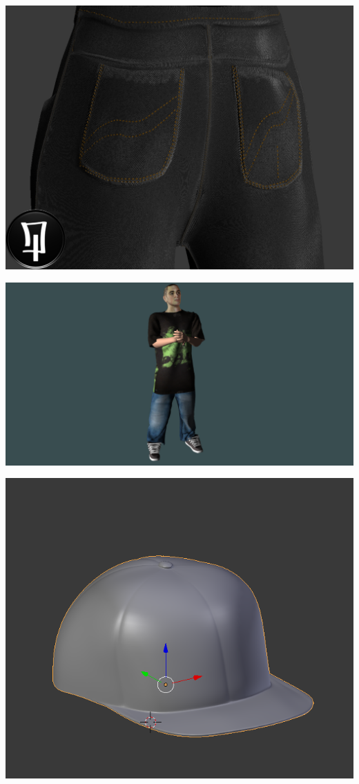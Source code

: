 \documentclass{article}
\begin{document}
  \includegraphics[width=\textwidth]{7.png}
  
  \includegraphics[width=\textwidth]{16.png}
  
  \includegraphics[width=\textwidth]{8.png}
  
\end{document}
